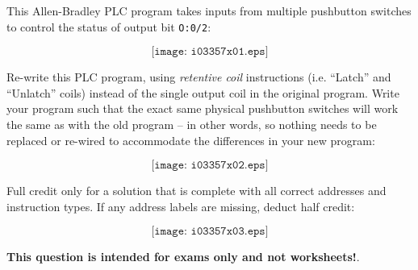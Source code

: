 

This Allen-Bradley PLC program takes inputs from multiple pushbutton switches to control the status of output bit {\tt O:0/2}:

$$\texttt{[image: i03357x01.eps]}$$

Re-write this PLC program, using {\it retentive coil} instructions (i.e. ``Latch'' and ``Unlatch'' coils) instead of the single output coil in the original program.  Write your program such that the exact same physical pushbutton switches will work the same as with the old program -- in other words, so nothing needs to be replaced or re-wired to accommodate the differences in your new program:

$$\texttt{[image: i03357x02.eps]}$$







Full credit only for a solution that is complete with all correct addresses and instruction types.  If any address labels are missing, deduct half credit:

$$\texttt{[image: i03357x03.eps]}$$







{\bf This question is intended for exams only and not worksheets!}.




